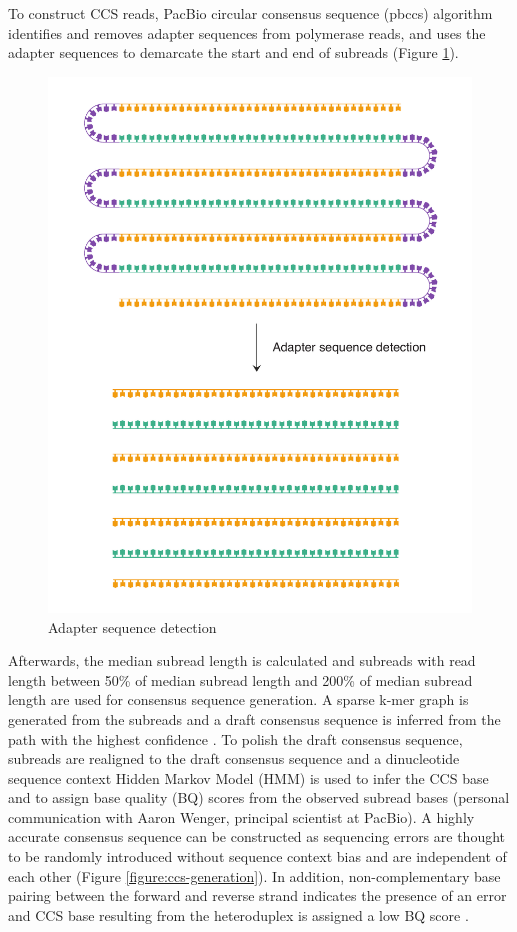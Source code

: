 To construct CCS reads, PacBio circular consensus sequence (pbccs) algorithm identifies and removes adapter sequences from polymerase reads, and uses the adapter sequences to demarcate the start and end of subreads (Figure \ref{figure:adapter-sequence-detection}). 

\begin{figure}[htbp!]
\caption{Adapter sequence detection}
\label{figure:adapter-sequence-detection}
\begin{centering}
\includegraphics[width=0.7
\textwidth]{Vector/adapter-sequence-detection.pdf}
\end{centering}
\end{figure}

Afterwards, the median subread length is calculated and subreads with read length between 50\% of median subread length and 200\% of median subread length are used for consensus sequence generation. A sparse k-mer graph is generated from the subreads and a draft consensus sequence is inferred from the path with the highest confidence \cite{Ye2016-qe}. To polish the draft consensus sequence, subreads are realigned to the draft consensus sequence and a dinucleotide sequence context Hidden Markov Model (HMM) is used to infer the CCS base and to assign base quality (BQ) scores from the observed subread bases (personal communication with Aaron Wenger, principal scientist at PacBio). A highly accurate consensus sequence can be constructed as sequencing errors are thought to be randomly introduced without sequence context bias and are independent of each other (Figure \ref{figure:ccs-generation}). In addition, non-complementary base pairing between the forward and reverse strand indicates the presence of an error and CCS base resulting from the heteroduplex is assigned a low BQ score \cite{ccs2023}. 

